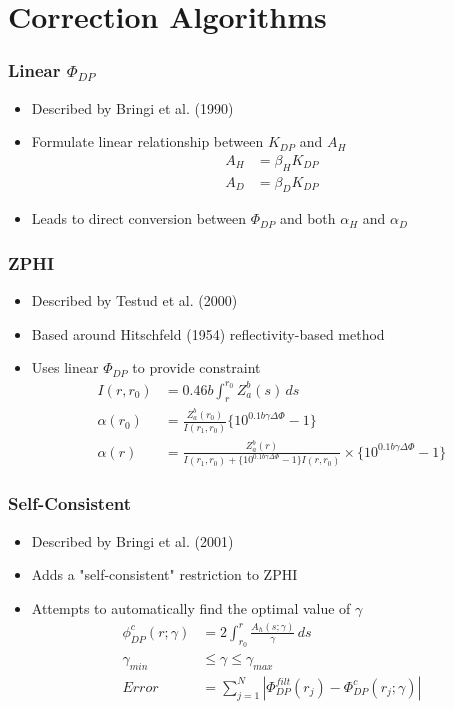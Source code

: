 \documentclass[red]{beamer}
\begin{document}
\section{Correction Algorithms}
\begin{frame}
	\frametitle{Linear $\Phi_{DP}$}
	\begin{itemize}
		\item Described by Bringi et al. (1990)
		\item Formulate linear relationship between $K_{DP}$ and $A_H$
		\begin{align*}
			A_H &= \beta_H K_{DP} \\
			A_D &= \beta_D K_{DP}
		\end{align*}
		\item Leads to direct conversion between $\Phi_{DP}$  and  both
				$\alpha_H$ and $\alpha_D$
	\end{itemize}
\end{frame}

\begin{frame}
	\frametitle{ZPHI}
	\begin{itemize}
		\item Described by Testud et al. (2000)
		\item Based around Hitschfeld (1954) reflectivity-based method
		\item Uses linear $\Phi_{DP}$ to provide constraint
			\begin{align*}
			I(r, r_0) &= \num{0.46}b\int_r^{r_0}Z_a^b(s)\,ds \\
			\alpha(r_0) &= \frac{Z_a^b(r_0)}{I(r_1,r_0)} \lbrace 10^{\num{0.1}b\gamma\Delta\Phi} - 1\rbrace \\
			\alpha(r) &= \frac{Z_a^b(r)}{I(r_1,r_0) + \lbrace 10^{\num{0.1}b\gamma\Delta\Phi} - 1\rbrace I(r, r_0)}
			  \times \lbrace 10^{\num{0.1}b\gamma\Delta\Phi} - 1\rbrace
			\end{align*}
	\end{itemize}
\end{frame}

\begin{frame}
	\frametitle{Self-Consistent}
	\begin{itemize}
		\item Described by Bringi et al. (2001)
		\item Adds a "self-consistent" restriction to ZPHI
		\item Attempts to automatically find the optimal value of $\gamma$
			 \begin{align*}
			\phi_{DP}^c(r;\gamma) &= 2 \int_{r_0}^r \frac{A_h(s;\gamma)}{\gamma}\,ds \\
			\gamma_{min} &\leq \gamma \leq \gamma_{max} \\
			Error &= \sum_{j=1}^N \left| \Phi_{DP}^{filt}(r_j) - \Phi_{DP}^c(r_j;\gamma) \right|
			\end{align*}
	\end{itemize}
\end{frame}
\end{document}
